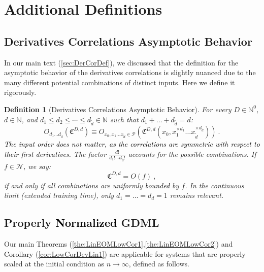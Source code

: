 \documentclass{article} %
\newtheorem{definition}{Definition}[section]
\begin{document}
\section{Additional Definitions}

\subsection{Derivatives Correlations Asymptotic Behavior}
\label{Zap:DerCorAsy}

In our main text (\ref{sec:DerCorDef}), we discussed that the definition for the asymptotic behavior of the derivatives correlations is slightly nuanced due to the many different potential combinations of distinct inputs. Here we define it rigorously.

\begin{definition}[Derivatives Correlations Asymptotic Behavior]
\textup
{For every \(D\in\mathbb{N}^0\), \(d\in\mathbb{N}\), and \(d_1\leq d_2\leq \cdots \leq d_{\tilde{d}}\in\mathbb{N}\) such that \(d_1+\ldots+d_{\tilde{d}}=d\):
\begin{equation}
O_{d_{1}\ldots d_{\tilde{d}}}\left(\mathfrak{C}^{D,d}\right)
\equiv
O_{x_{0},x_{1}\ldots x_{\tilde{d}}\in\mathcal{P}}\left(\mathfrak{C}^{D,d}\left(x_{0},x_{1}^{\times d_{1}}\ldots x_{\tilde{d}}^{\times d_{\tilde{d}}}\right)\right) \ .
\label{eq:def:CorAsyBehavior1}
\end{equation}
\textcolor{black}{The input order does not matter, as the correlations are symmetric with respect to their first derivatives.} The factor \(\frac{d!}{d_{1}!\cdots d_{\tilde{d}}!}\) accounts for the possible combinations.
If \(f\in\mathcal{N}\), we say:
\begin{equation}
\mathfrak{C}^{D,d}=O\left(f\right) \ ,
\label{eq:def:CorAsyBehavior2}
\end{equation}
if and only if all combinations are uniformly \textcolor{black}{bounded} by \(f\). In the continuous limit (extended training time), only \(d_{1}=\ldots=d_{d}=1\) remains relevant.}
\end{definition}

\subsection{Properly \textcolor{black}{Normalized} GDML}
\label{zap:sec:PGDML}

Our main \textcolor{black}{Theorems} (\ref{the:LinEOMLowCor1},\ref{the:LinEOMLowCor2}) and \textcolor{black}{Corollary} (\ref{cor:LowCorDevLin1}) are applicable for systems that are properly scaled \textcolor{black}{at} the initial condition \textcolor{black}{as} \(n\rightarrow\infty\), defined as follows. 
\end{document}
